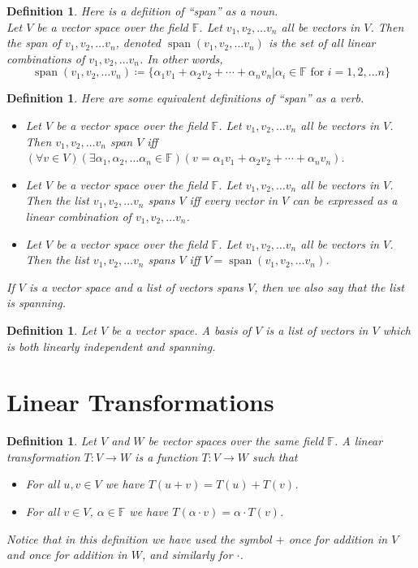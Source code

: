 \documentclass[12pt]{article}
\DeclareMathOperator{\spann}{span}
\newcounter{prmc}
\newtheorem{dfn}[prmc]{Definition}
\begin{document}
\begin{dfn}
  Here is a defiition of ``span'' as a noun.\\

  Let $V$ be a vector space over the field $\mathbb{F}$.  Let
  $v_1,v_2,\ldots v_n$ all be vectors in $V$.  Then the span of
  $v_1,v_2,\ldots v_n$, denoted $\spann(v_1,v_2,\ldots v_n)$ is the
  set of all linear combinations of $v_1,v_2,\ldots v_n$.  In other
  words,
  $$\spann(v_1,v_2,\ldots v_n)\coloneqq
  \{\alpha_1v_1+\alpha_2v_2+\cdots+\alpha_nv_n |
  \alpha_i\in\mathbb{F}\textrm{ for }i=1,2,\ldots n\}$$
\end{dfn}

\begin{dfn}
  Here are some equivalent definitions of ``span'' as a verb.
  \begin{itemize}
    \item Let $V$ be a vector space over the field $\mathbb{F}$.  Let
      $v_1,v_2,\ldots v_n$ all be vectors in $V$.  Then $v_1,
      v_2,\ldots v_n$ span $V$ iff $(\forall v\in V)(\exists
      \alpha_1,\alpha_2,\ldots\alpha_n\in\mathbb{F})(v=\alpha_1v_1+\alpha_2v_2+\cdots+\alpha_nv_n)$.
    \item Let $V$ be a vector space over the field $\mathbb{F}$.  Let
      $v_1,v_2,\ldots v_n$ all be vectors in $V$.  Then the list $v_1,
      v_2,\ldots v_n$ spans $V$ iff every vector in $V$ can be
      expressed as a linear combination of $v_1,v_2,\ldots v_n$.
    \item Let $V$ be a vector space over the field $\mathbb{F}$.  Let
      $v_1,v_2,\ldots v_n$ all be vectors in $V$.  Then the list $v_1,
      v_2,\ldots v_n$ spans $V$ iff $V=\spann(v_1,v_2,\ldots v_n)$.
  \end{itemize}
  If $V$ is a vector space and a list of vectors spans $V$, then we
  also say that the list is \textit{spanning}.
\end{dfn}

\begin{dfn}
  Let $V$ be a vector space.  A basis of $V$ is a list of vectors in
  $V$ which is both linearly independent and spanning.
\end{dfn}

\section{Linear Transformations}

\begin{dfn}
  Let $V$ and $W$ be vector spaces over the same field $\mathbb{F}$.
  A linear transformation $T:V\rightarrow W$ is a function
  $T:V\rightarrow W$ such that
  \begin{itemize}
  \item For all $u,v\in V$ we have $T(u+v)=T(u)+T(v)$.
  \item For all $v\in V$, $\alpha\in\mathbb{F}$ we have $T(\alpha\cdot
    v)=\alpha\cdot T(v)$.
  \end{itemize}

  Notice that in this definition we have used the symbol $+$ once for
  addition in $V$ and once for addition in $W$, and similarly for
  $\cdot$.
\end{dfn}
\end{document}
